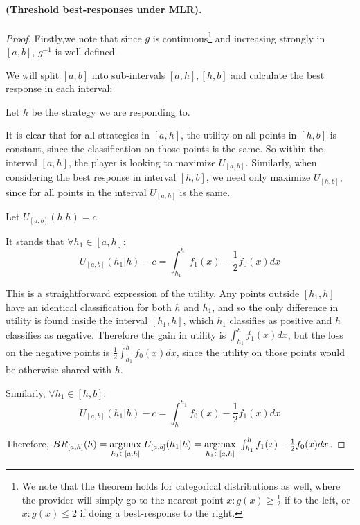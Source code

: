 \paragraph{ (Threshold best-responses under MLR).}
\begin{proof}
    Firstly,we note that since $g$ is continuous\footnote{We note that the theorem holds for categorical distributions as well, where the provider will simply go to the nearest point $x: g(x) \ge \frac{1}{2}$ if to the left, or $x: g(x) \le 2$ if doing a best-response to the right.} and increasing strongly in $[a,b]$, $g^{-1}$ is well defined.
  
    We will split $[a,b]$ into sub-intervals $[a,h] , [h,b]$ and calculate the best response in each interval:

    Let $h$ be the strategy we are responding to.
    

    It is clear that for all strategies in $[a,h]$, the utility on all points in $[h,b]$ is constant, since the classification on those points is the same. 
    So within the interval $[a,h]$, the player is looking to maximize $U_{[a,h]}$.
    Similarly, when considering the best response in interval $[h,b]$,  we need only maximize $U_{[h,b]}$, since for all points in the interval $U_{[a,h]}$ is the same.
    
    
    Let $ U_{[a,b]}(h|h) = c$. 
    
    It stands that $\forall h_1 \in [a,h]$: $$U_{[a,b]}(h_1|h) -  c = \int_{h_1}^h f_1(x) - \frac{1}{2}f_0(x) dx$$
    
    This is a straightforward expression of the utility. Any points outside $[h_1,h]$ have an identical classification for both $h$ and $h_1$, and so the only difference in utility is found inside the interval $[h_1,h]$, which $h_1$ classifies as positive and $h$ classifies as negative. 
    Therefore the gain in utility is $\int_{h_1}^h f_1(x) dx$, but the loss on the negative points is $\frac{1}{2}\int_{h_1}^h 
     f_0(x) dx$, since the utility on those points would be otherwise shared with $h$.
     
    Similarly, $\forall h_1 \in [h,b]$: $$U_{[a,b]}(h_1|h) -  c = \int_{h}^{h_1} f_0(x) - \frac{1}{2}f_1(x) dx$$
    

    Therefore,  $BR_{[a,h]}(h) = \underset{h_1 \in [a,h]}{\operatorname*{argmax}} \ U_{[a,b]}(h_1|h) =  \underset{h_1 \in [a,h]}{\operatorname*{argmax}} \  \int_{h_1}^h f_1(x) - \frac{1}{2}f_0(x) dx $.
    

\end{proof}
